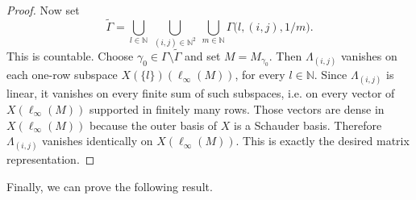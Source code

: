 \documentclass[11pt]{amsart}
\theoremstyle{plain}
\theoremstyle{definition}
\numberwithin{equation}{section}
\newcommand{\N}{\mathbb{N}}
\begin{document}
\begin{proof}
Now set
\[
\widetilde\Gamma
= \bigcup_{l\in\N}\ \bigcup_{(i,j)\in\N^2}\ \bigcup_{m\in\N}
\Gamma\bigl(l,(i,j),1/m\bigr).
\]
This is countable. Choose $\gamma_0\in\Gamma\setminus\widetilde\Gamma$ and set $M=M_{\gamma_0}$.
Then $\Lambda_{(i,j)}$ vanishes on each one-row subspace
$X(\{l\})(\ell_\infty(M))$, for every $l\in\N$.
Since $\Lambda_{(i,j)}$ is linear, it vanishes on every finite sum of such subspaces, i.e. on every vector of $X(\ell_\infty(M))$ supported in finitely many rows.
Those vectors are dense in $X(\ell_\infty(M))$ because the outer basis of $X$ is a Schauder basis.
Therefore $\Lambda_{(i,j)}$ vanishes identically on $X(\ell_\infty(M))$.
This is exactly the desired matrix representation.
\end{proof}

Finally, we can prove the following result.
\end{document}
